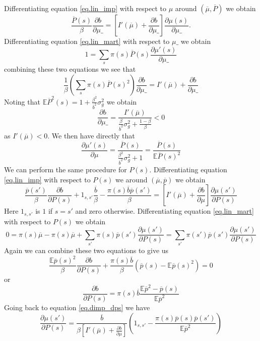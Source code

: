 \documentclass[thmsb,11pt]{article}
\newcommand{\EE}{\mathbb E}
\newcommand{\pbar}{{\overline p}}
\newcommand{\bbar}{{\overline b}}
\newcommand{\mubar}{{\overline \mu}}
\begin{document}
Differentiating equation \eqref{eq.lin_imp} with respect to $\mu$ around $(\overline \mu,\overline P)$ we obtain
\[
	\frac{\overline{P}(s)}{\beta}\frac{\partial b}{\partial \mu\_} = \left[I'(\mubar)+\frac{\partial b}{\partial \mu\_}\right]\frac{\partial \mu(s)}{\partial \mu\_}.
\]Differentiating equation \eqref{eq.lin_mart} with respect to $\mu\_$ we obtain
\[
	1 = \sum_{s} \pi(s) \overline P(s) \frac{\partial \mu'(s)}{\partial \mu\_}
\]combining these two equations we see that
\[
	\frac1\beta\left(\sum_s\pi(s)\overline P(s)^2\right)\frac{\partial b}{\partial \mu\_} = I'(\mubar) + \frac{\partial b}{\partial \mu\_}
\]Noting that $\EE\overline P^2(s) = 1 + \frac{\beta^2}{\bbar^2}\sigma^2_g$ we obtain
\begin{equation}
	\frac{\partial b}{\partial \mu\_} = \frac{I'(\mubar)}{\frac{\beta}{\bbar^2}\sigma_g^2 +\frac{1-\beta}{\beta}} < 0
\end{equation}as $I'(\mubar) < 0$.  We then have directly that
\begin{equation}
	\frac{\partial \mu'(s)}{\partial \mu} = \frac{\overline P(s)}{\frac{\beta^2}{\overline b^2}\sigma^2_g +1} = \frac{\overline P(s)}{\EE\overline P(s)^2}
\end{equation}  We can perform the same procedure for $P(s)$.  Differentiating equation \eqref{eq.lin_imp} with respect to $P(s)$ we around $(\mubar,\pbar)$ we obtain
\begin{equation}\label{eq.dimp_dps}
\frac{\pbar(s')}{\beta}\frac{\partial b}{\partial P(s)} + 1_{s,s'}\frac{\bbar}{\beta} - \frac{\pi(s)\bbar\pbar(s')}{\beta} = \left[I'(\mubar) + \frac{\partial b}{\partial \mu}\right]\frac{\partial \mu(s')}{\partial P(s)}
\end{equation} Here $1_{s,s'}$ is $1$ if $s = s'$ and zero otherwise.  Differentiating equation \eqref{eq.lin_mart} with respect to $P(s)$ we obtain
\[
	0 = \pi(s)\overline \mu - \pi(s)\overline \mu + \sum_{s'} \pi(s) \pbar(s')\frac{\partial \mu(s')}{\partial P(s)} =  \sum_{s'} \pi(s')\pbar(s')\frac{\partial \mu(s')}{\partial P(s)}
\]  Again we can combine these two equations to give us
\[
	\frac{\EE\pbar(s)^2}{\beta}\frac{\partial b}{\partial P(s)} + \frac{\pi(s)\bbar}{\beta}(\pbar(s)-\EE\pbar(s)^2) = 0
\] or
\begin{equation}
	\frac{\partial b}{\partial P(s)} = \pi(s)\bbar \frac{\EE\pbar^2-\pbar(s)}{\EE\pbar^2}
\end{equation}Going back to equation \eqref{eq.dimp_dps} we have
\begin{equation}
	\frac{\partial \mu(s')}{\partial P(s)} = \frac{\bbar}{\beta\left[I '(\mubar) + \frac{\partial b}{\partial \mu}\right]}\left(1_{s,s'}-\frac{\pi(s)\pbar(s)\pbar(s')}{\EE\pbar^2}\right)
\end{equation}
\end{document}
